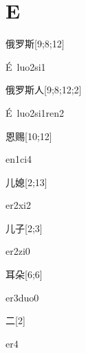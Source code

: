 ﻿%
\section*{E}

\begin{verbete}[É\ luo2si1]{俄罗斯}[9;8;12]
\begin{pronuncia}{É\ luo2si1}
\end{pronuncia}
\end{verbete}

\begin{verbete}{俄罗斯人}[9;8;12;2]
\begin{pronuncia}[\\]{É\ luo2si1ren2}
\end{pronuncia}
\end{verbete}


\begin{verbete}[en1ci4]{恩赐}[10;12]
\begin{pronuncia}{en1ci4}
\end{pronuncia}
\end{verbete}

\begin{verbete}[er2xi2]{儿媳}[2;13]
\begin{pronuncia}{er2xi2}
\end{pronuncia}
\end{verbete}

\begin{verbete}[er2zi0]{儿子}[2;3]
\begin{pronuncia}{er2zi0}
\end{pronuncia}
\end{verbete}

\begin{verbete}[er3duo0]{耳朵}[6;6]
\begin{pronuncia}{er3duo0}
\end{pronuncia}
\end{verbete}

\begin{verbete}[er4]{二}[2]
\begin{pronuncia}{er4}
\end{pronuncia}
\end{verbete}

